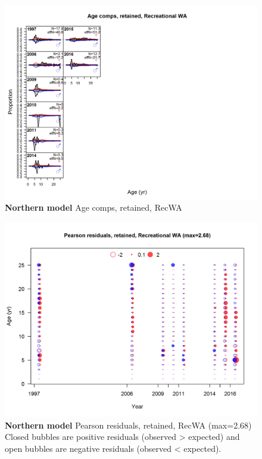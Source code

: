 \documentclass[12pt,]{article}
\begin{document}
\begin{figure}[htbp]
\centering
\includegraphics{./r4ss/plots_mod1/comp_agefit_flt4mkt2.png}
\caption{\textbf{Northern model} Age comps, retained, RecWA
\label{fig:mod1_6_comp_agefit_flt4mkt2}}
\end{figure}

\begin{figure}[htbp]
\centering
\includegraphics{./r4ss/plots_mod1/comp_agefit_residsflt4mkt2.png}
\caption{\textbf{Northern model} Pearson residuals, retained, RecWA
(max=2.68)\\
Closed bubbles are positive residuals (observed \textgreater{} expected)
and open bubbles are negative residuals (observed \textless{} expected).
\label{fig:mod1_7_comp_agefit_residsflt4mkt2}}
\end{figure}
\end{document}

